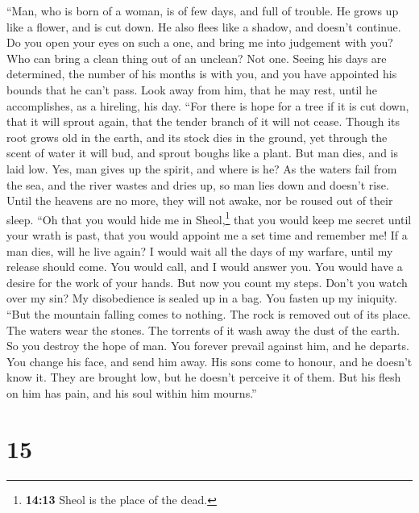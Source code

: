  ``Man, who is born of a woman, is of few days, and full
of trouble.  He grows up like a flower, and is cut down.
He also flees like a shadow, and doesn't continue.  Do you
open your eyes on such a one, and bring me into judgement with you?
 Who can bring a clean thing out of an unclean? Not one.
 Seeing his days are determined, the number of his months
is with you, and you have appointed his bounds that he can't pass.
 Look away from him, that he may rest, until he
accomplishes, as a hireling, his day.  ``For there is hope
for a tree if it is cut down, that it will sprout again, that the tender
branch of it will not cease.  Though its root grows old in
the earth, and its stock dies in the ground,  yet through
the scent of water it will bud, and sprout boughs like a plant.
 But man dies, and is laid low. Yes, man gives up the
spirit, and where is he?  As the waters fail from the
sea, and the river wastes and dries up,  so man lies down
and doesn't rise. Until the heavens are no more, they will not awake,
nor be roused out of their sleep.  ``Oh that you would
hide me in Sheol,\footnote{\textbf{14:13} Sheol is the place of the
  dead.} that you would keep me secret until your wrath is past, that
you would appoint me a set time and remember me!  If a
man dies, will he live again? I would wait all the days of my warfare,
until my release should come.  You would call, and I
would answer you. You would have a desire for the work of your hands.
 But now you count my steps. Don't you watch over my sin?
 My disobedience is sealed up in a bag. You fasten up my
iniquity.  ``But the mountain falling comes to nothing.
The rock is removed out of its place.  The waters wear
the stones. The torrents of it wash away the dust of the earth. So you
destroy the hope of man.  You forever prevail against
him, and he departs. You change his face, and send him away.
 His sons come to honour, and he doesn't know it. They
are brought low, but he doesn't perceive it of them.  But
his flesh on him has pain, and his soul within him mourns.''

\hypertarget{section-14}{%
\section{15}\label{section-14}}

